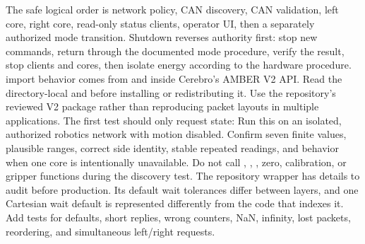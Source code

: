 {}
\markdownRendererSectionEnd \markdownRendererSectionBegin
{}\markdownRendererInterblockSeparator
{}The safe logical order is network policy, CAN discovery, CAN validation, left core, right core, read-only status clients, operator UI, then a separately authorized mode transition. Shutdown reverses authority first: stop new commands, return through the documented mode procedure, verify the result, stop clients and cores, then isolate energy according to the hardware procedure.\markdownRendererInterblockSeparator
{}
\markdownRendererSectionEnd 
\markdownRendererSectionEnd \markdownRendererSectionBegin
{}\markdownRendererInterblockSeparator
{}\markdownRendererBlockQuoteBegin
{} import behavior comes from  and  inside Cerebro's AMBER V2 API. Read the directory-local  and  before installing or redistributing it.\markdownRendererBlockQuoteEnd \markdownRendererInterblockSeparator
{}Use the repository's reviewed V2 package rather than reproducing packet layouts in multiple applications. The first test should only request state:\markdownRendererInterblockSeparator
{}\markdownRendererInterblockSeparator
{}Run this on an isolated, authorized robotics network with motion disabled. Confirm seven finite values, plausible ranges, correct side identity, stable repeated readings, and behavior when one core is intentionally unavailable. Do not call , , , zero, calibration, or gripper functions during the discovery test.\markdownRendererParagraphSeparator
{}The repository wrapper has details to audit before production. Its default wait tolerances differ between layers, and one Cartesian wait default is represented differently from the code that indexes it. Add tests for defaults, short replies, wrong counters, NaN, infinity, lost packets, reordering, and simultaneous left/right requests.\markdownRendererInterblockSeparator
